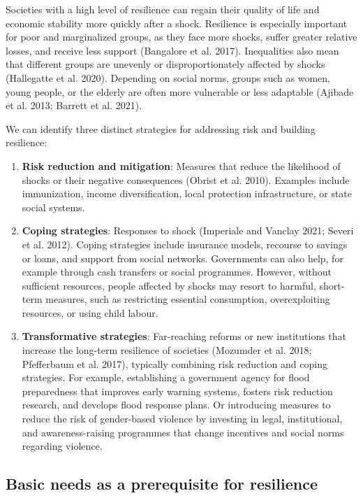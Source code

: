 \documentclass[
  a4paper,
  DIV=11,
  numbers=noendperiod,
  oneside,
  openany]{scrreprt}
\begin{document}
Societies with a high level of resilience can regain their quality of
life and economic stability more quickly after a shock. Resilience is
especially important for poor and marginalized groups, as they face more
shocks, suffer greater relative losses, and receive less support
(Bangalore et al. 2017). Inequalities also mean that different groups
are unevenly or disproportionately affected by shocks (Hallegatte et al.
2020). Depending on social norms, groups such as women, young people, or
the elderly are often more vulnerable or less adaptable (Ajibade et al.
2013; Barrett et al. 2021).

We can identify three distinct strategies for addressing risk and
building resilience:

\begin{enumerate}
\def\labelenumi{\arabic{enumi}.}
\item
  \textbf{Risk reduction and mitigation}: Measures that reduce the
  likelihood of shocks or their negative consequences (Obrist et al.
  2010). Examples include immunization, income diversification, local
  protection infrastructure, or state social systems.
\item
  \textbf{Coping strategies}: Responses to shock (Imperiale and Vanclay
  2021; Severi et al. 2012). Coping strategies include insurance models,
  recourse to savings or loans, and support from social networks.
  Governments can also help, for example through cash transfers or
  social programmes. However, without sufficient resources, people
  affected by shocks may resort to harmful, short-term measures, such as
  restricting essential consumption, overexploiting resources, or using
  child labour.
\item
  \textbf{Transformative strategies}: Far-reaching reforms or new
  institutions that increase the long-term resilience of societies
  (Mozumder et al. 2018; Pfefferbaum et al. 2017), typically combining
  risk reduction and coping strategies. For example, establishing a
  government agency for flood preparedness that improves early warning
  systems, fosters risk reduction research, and develops flood response
  plans. Or introducing measures to reduce the risk of gender-based
  violence by investing in legal, institutional, and awareness-raising
  programmes that change incentives and social norms regarding violence.
\end{enumerate}

\subsection{Basic needs as a prerequisite for
resilience}\label{basic-needs-as-a-prerequisite-for-resilience}
\end{document}
